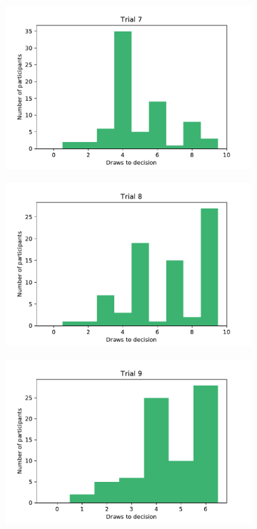 \begin{figure}
\begin{subfigure}{0.48\textwidth}
        \includegraphics[scale=0.36]{pictures/dtd7_histogram.pdf}
    \end{subfigure}
    \hfill
    \begin{subfigure}{0.48\textwidth}
        \includegraphics[scale=0.36]{pictures/dtd8_histogram.pdf}
    \end{subfigure}
     \vfill
    \begin{subfigure}{0.48\textwidth}
        \includegraphics[scale=0.36]{pictures/dtd9_histogram.pdf}

\end{subfigure}
\end{figure}
